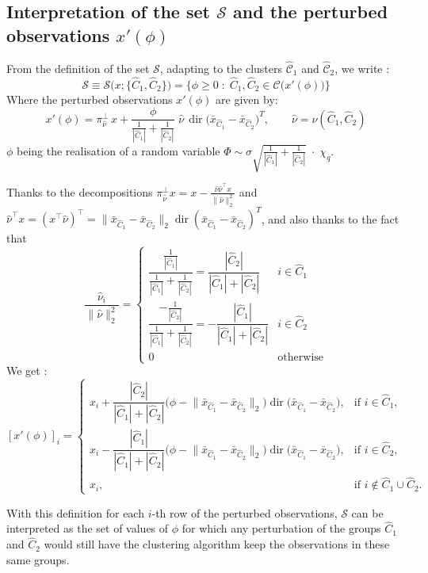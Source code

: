 \documentclass[11pt,a4paper]{article}
\newcommand{\C}{\mathcal{C}}                       %
\begin{document}
\subsection{Interpretation of the set $\mathcal{S}$ and the perturbed observations $x'(\phi)$}

From the definition of the set $\mathcal{S}$, adapting to the clusters $\hat{\C}_1$ and $\hat{\C}_2$, we write :
\[
\mathcal{S} \equiv \mathcal{S}\big(x; \{\hat C_1,\hat C_2\}\big) = \big\{\phi \ge 0 \;:\; \hat C_1, \hat C_2 \in \mathcal{C}\big(x'(\phi)\big)\big\}
\]
Where the perturbed observations $x'(\phi)$ are given by:
\[
x'(\phi) = \pi^{\perp}_{\hat\nu}\, x + \frac{\phi}{\frac{1}{|\hat C_1|} + \frac{1}{|\hat C_2|}}\; \hat\nu\, \operatorname{dir}\big(\bar x_{\hat C_1} - \bar x_{\hat C_2}\big)^{T},
\qquad \hat\nu = \nu(\hat C_1, \hat C_2)
\]
$\phi$ being the realisation of a random variable $\Phi \sim \sigma\sqrt{\frac{1}{|\hat{C}_1|} + \frac{1}{|\hat{C}_2|}}\;\cdot\;\chi_q$.

Thanks to the decompositions $\pi^\perp_{\hat\nu}x = x-\frac{\hat\nu\hat\nu^\top x}{\|\hat\nu\|_2^2}$ and $\hat\nu^\top x=(x^\top\hat\nu)^\top=\|\bar x_{\hat C_1}-\bar x_{\hat C_2}\|_2\operatorname{dir}(\bar x_{\hat C_1}-\bar x_{\hat C_2})^T$, and also thanks to the fact that
\[
\frac{\hat\nu_i}{\|\hat\nu\|_2^2}=
\begin{cases}
\dfrac{\frac{1}{|\hat{C}_1|}}{\frac{1}{|\hat{C}_1|}+\frac{1}{|\hat{C}_2|}}=\dfrac{|\hat{C}_2|}{|\hat{C}_1|+|\hat{C}_2|} & i\in\hat C_1\\[3mm]
\dfrac{-\frac{1}{|\hat{C}_2|}}{\frac{1}{|\hat{C}_1|}+\frac{1}{|\hat{C}_2|}}=-\dfrac{|\hat{C}_1|}{|\hat{C}_1|+|\hat{C}_2|} & i\in\hat C_2\\[3mm]
0 & \text{otherwise}
\end{cases}
\]
We get :
\[
[x'(\phi)]_i =
\begin{cases}
x_i + \dfrac{|\hat C_2|}{|\hat C_1| + |\hat C_2|}\Big(\phi - \big\|\bar x_{\hat C_1} - \bar x_{\hat C_2}\big\|_2\Big)\operatorname{dir}\big(\bar x_{\hat C_1} - \bar x_{\hat C_2}\big), & \text{if } i \in \hat C_1, \\[4mm]
x_i - \dfrac{|\hat C_1|}{|\hat C_1| + |\hat C_2|}\Big(\phi - \big\|\bar x_{\hat C_1} - \bar x_{\hat C_2}\big\|_2\Big)\operatorname{dir}\big(\bar x_{\hat C_1} - \bar x_{\hat C_2}\big), & \text{if } i \in \hat C_2, \\[4mm]
x_i, & \text{if } i \notin \hat C_1 \cup \hat C_2.
\end{cases}
\]

With this definition for each $i$-th row of the perturbed observations, $\mathcal{S}$ can be interpreted as the set of values of $\phi$ for which any perturbation of the groups $\hat{C}_1$ and $\hat{C}_2$ would still have the clustering algorithm keep the observations in these same groups.
\end{document}
